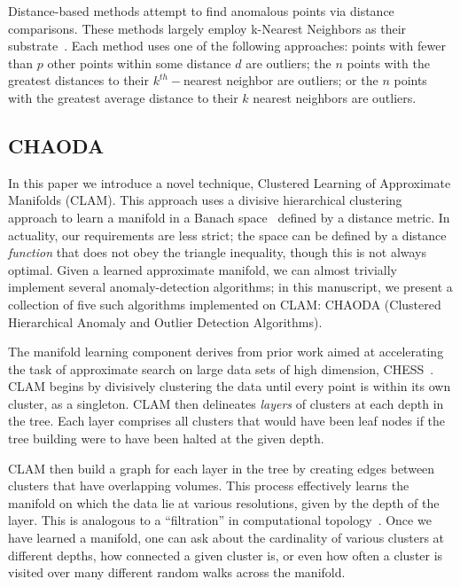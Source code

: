 Distance-based methods attempt to find anomalous points via distance comparisons.
These methods largely employ k-Nearest Neighbors as their substrate~\cite{wang_progress_2019}.
Each method uses one of the following approaches: points with fewer than $p$ other points within some distance $d$ are outliers; the $n$ points with the greatest distances to their $k^{th}-$nearest neighbor are outliers; or the $n$ points with the greatest average distance to their $k$ nearest neighbors are outliers.

\subsection{CHAODA}

In this paper we introduce a novel technique, Clustered Learning of Approximate Manifolds (CLAM).
This approach uses a divisive hierarchical clustering approach to learn a manifold in a Banach space~\cite{banach1929fonctionnelles} defined by a distance metric.
In actuality, our requirements are less strict; the space can be defined by a distance \textit{function} that does not obey the triangle inequality, though this is not always optimal. 
Given a learned approximate manifold, we can almost trivially implement several anomaly-detection algorithms; in this manuscript, we present a collection of five such algorithms implemented on CLAM: CHAODA (Clustered Hierarchical Anomaly and Outlier Detection Algorithms).

The manifold learning component derives from prior work aimed at accelerating the task of approximate search on large data sets of high dimension, CHESS~\cite{ishaq2019entropy}.
CLAM begins by divisively clustering the data until every point is within its own cluster, as a singleton.
CLAM then delineates \textit{layers} of clusters at each depth in the tree.
Each layer comprises all clusters that would have been leaf nodes if the tree building were to have been halted at the given depth.

CLAM then build a graph for each layer in the tree by creating edges between clusters that have overlapping volumes.
This process effectively learns the manifold on which the data lie at various resolutions, given by the depth of the layer.
This is analogous to a ``filtration'' in computational topology~\cite{carlsson2009topology}.
Once we have learned a manifold, one can ask about the cardinality of various clusters at different depths, how connected a given cluster is, or even how often a cluster is visited over many different random walks across the manifold.

